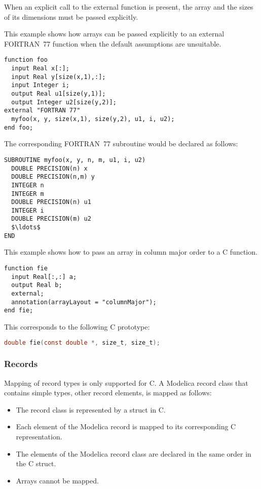 When an explicit call to the external function is present, the array and
the sizes of its dimensions must be passed explicitly.

\begin{example}
This example shows how arrays can be passed explicitly to an
external FORTRAN~77 function when the default assumptions are
unsuitable.

\begin{lstlisting}[language=modelica]
function foo
  input Real x[:];
  input Real y[size(x,1),:];
  input Integer i;
  output Real u1[size(y,1)];
  output Integer u2[size(y,2)];
external "FORTRAN 77"
  myfoo(x, y, size(x,1), size(y,2), u1, i, u2);
end foo;
\end{lstlisting}
The corresponding FORTRAN~77 subroutine would be declared as follows:
\begin{lstlisting}[language=FORTRAN77]
SUBROUTINE myfoo(x, y, n, m, u1, i, u2)
  DOUBLE PRECISION(n) x
  DOUBLE PRECISION(n,m) y
  INTEGER n
  INTEGER m
  DOUBLE PRECISION(n) u1
  INTEGER i
  DOUBLE PRECISION(m) u2
  $\ldots$
END
\end{lstlisting}

This example shows how to pass an array in column major order to a C function.

\begin{lstlisting}[language=modelica]
function fie
  input Real[:,:] a;
  output Real b;
  external;
  annotation(arrayLayout = "columnMajor");
end fie;
\end{lstlisting}
This corresponds to the following C prototype:
\begin{lstlisting}[language=C]
double fie(const double *, size_t, size_t);
\end{lstlisting}
\end{example}

\subsubsection{Records}\label{records}

Mapping of record types is only supported for C. A Modelica record class
that contains simple types, other record elements, is mapped as follows:
\begin{itemize}
\item
  The record class is represented by a struct in C.
\item
  Each element of the Modelica record is mapped to its corresponding C
  representation.
\item
  The elements of the Modelica record class are declared in the same
  order in the C struct.
\item
  Arrays cannot be mapped.
\end{itemize}

